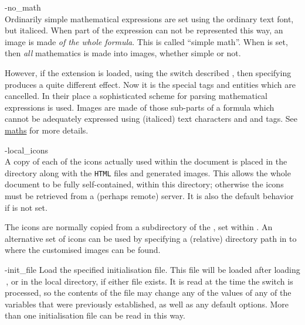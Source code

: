 \begin{htmllist}
%

\item [ -no\_math\label{cs_nomath}]
\\
Ordinarily simple mathematical expressions are set using the ordinary text font, 
but italiced. When part of the expression can not be represented this way,
an image is made \emph{of the whole formula}. 
This is called ``simple math''.
When  is set, 
then \emph{all} mathematics is made into images, whether simple or not.

However, if the  extension is loaded, 
using the  switch described ,
then specifying  produces a quite different effect.
Now it is the special  tags and entities which are cancelled. 
In their place a sophisticated scheme for parsing mathematical expressions 
is used. Images are made of those sub-parts of a formula which cannot be 
adequately expressed using (italiced) text characters and  and
 tags.
See \hyperref{the subsection on mathematics}{Section~}{}{maths} for more details.

%

\item [-local\_icons\label{cs_localicons}]
\\
A copy of each of the icons actually used within the document is placed in the
directory along with the \texttt{HTML} files and generated images.
This allows the whole document to be fully self-contained, within this directory;
otherwise the icons must be retrieved from a (perhaps remote) server.
It is also the default behavior if  is not set.

%
The icons are normally copied from a subdirectory of the ,
set within . An alternative set of icons can be used
by specifying a (relative) directory path in 
to where the customised images can be found.


%
%

\item [ -init\_file \Meta{file}\label{cs_initfile}]
Load the specified initialisation file. This \Perl{} file will be loaded after loading 
\,, or  in the local
directory, if either file exists. It is read at the time the switch is processed,
so the contents of the file may change any of the values of any of the
variables that were previously established, as well as any default options.
More than one initialisation file can be read in this way.%


\end{htmllist}
